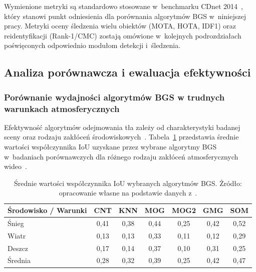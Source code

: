 Wymienione metryki są standardowo stosowane w~benchmarku CDnet 2014~\cite{cdnet2014}, który stanowi
punkt odniesienia dla porównania algorytmów BGS w~niniejszej pracy. Metryki oceny śledzenia wielu
obiektów (MOTA, HOTA, IDF1) oraz reidentyfikacji (Rank-1/CMC) zostają omówione w~kolejnych
podrozdziałach poświęconych odpowiednio modułom detekcji i~śledzenia.

\subsection{Analiza porównawcza i ewaluacja efektywności}

\subsubsection{Porównanie wydajności algorytmów BGS w trudnych warunkach atmosferycznych}

Efektywność algorytmów odejmowania tła zależy od charakterystyki badanej sceny oraz rodzaju
zakłóceń środowiskowych~\cite{bouwmans2014}. Tabela~\ref{tab:iou_bgs_comparison} przedstawia
średnie wartości współczynnika IoU uzyskane przez wybrane algorytmy BGS w~badaniach porównawczych
dla różnego rodzaju zakłóceń atmosferycznych wideo~\cite{karbowiak2022}.

\begin{table}[htbp]
  \centering
  \caption{Średnie wartości współczynnika IoU wybranych algorytmów BGS. Żródło: opracowanie własne na podstawie danych z~\cite{karbowiak2022}.}
  \label{tab:iou_bgs_comparison}
  \begin{tabular}{|l|c|c|c|c|c|c|}
    \hline
    \textbf{Środowisko / Warunki}
            & \textbf{CNT} & \textbf{KNN} & \textbf{MOG} & \textbf{MOG2} & \textbf{GMG} & \textbf{SOM} \\ \hline
    Śnieg   & 0,41         & 0,38         & 0,44         & 0,25          & 0,42         & 0,52         \\ \hline
    Wiatr   & 0,13         & 0,13         & 0,33         & 0,11          & 0,12         & 0,29         \\ \hline
    Deszcz  & 0,17         & 0,14         & 0,37         & 0,10          & 0,31         & 0,25         \\ \hline
    Średnia & 0,28         & 0,32         & 0,39         & 0,25          & 0,42         & 0,47         \\ \hline
  \end{tabular}
\end{table}

